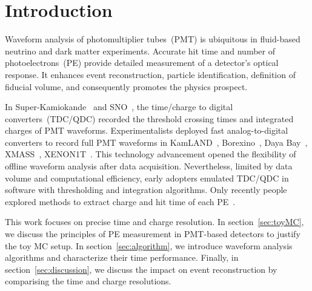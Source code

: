 \section{Introduction}
\label{sec:introduction}

Waveform analysis of photomultiplier tubes~(PMT) is ubiquitous in fluid-based neutrino and dark matter experiments. Accurate hit time and number of photoelectrons~(PE) provide detailed measurement of a detector's optical response. It enhances event reconstruction, particle identification, definition of fiducial volume, and consequently promotes the physics prospect.

In Super-Kamiokande~\cite{noauthor_super-kamiokande_2003} and SNO~\cite{dunger_event_2019}, the time/charge to digital converters~(TDC/QDC) recorded the threshold crossing times and integrated charges of PMT waveforms.  Experimentalists deployed fast analog-to-digital converters to record full PMT waveforms in KamLAND~\cite{the_kamland_collaboration_production_2010}, Borexino~\cite{alimonti_borexino_2009}, Daya Bay~\cite{huang_flash_2018}, XMASS~\cite{abe_xmass_2013}, XENON1T~\cite{aprile_xenon1t_2019}.  This technology advancement opened the flexibility of offline waveform analysis after data acquisition.  Nevertheless, limited by data volume and computational efficiency, early adopters emulated TDC/QDC in software with thresholding and integration algorithms.  Only recently people explored methods to extract charge and hit time of each PE~\cite{zhang_comparison_2019}.

This work focuses on precise time and charge resolution. In section~\ref{sec:toyMC}, we discuss the principles of PE measurement in PMT-based detectors to justify the toy MC setup.  In section~\ref{sec:algorithm}, we introduce waveform analysis algorithms and characterize their time performance.  Finally, in section~\ref{sec:discussion}, we discuss the impact on event reconstruction by comparising the time and charge resolutions.
